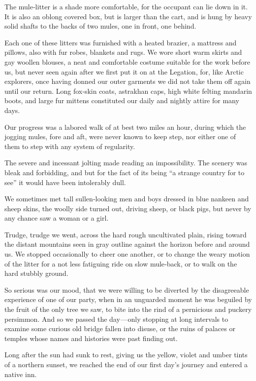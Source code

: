 \documentclass[12pt]{book}
\begin{document}
The mule‐litter is a shade more comfortable, for the occupant can lie down
in it. It is also an oblong covered box, but is larger than the cart, and is hung by
heavy solid shafts to the backs of two mules, one in front, one behind.

Each one of these litters was furnished with a heated brazier, a mattress and
pillows, also with fur robes, blankets and rugs. We wore short warm skirts and
gay woollen blouses, a neat and comfortable costume suitable for the work before
us, but never seen again after we first put it on at the Legation, for, like Arctic
explorers, once having donned our outer garments we did not take them off again
until our return. Long fox‐skin coats, astrakhan caps, high white felting mandarin
boots, and large fur mittens constituted our daily and nightly attire for many
days.

Our progress was a labored walk of at best two miles an hour, during which
the jogging mules, fore and aft, were never known to keep step, nor either one of
them to step with any system of regularity.

The severe and incessant jolting made reading an impossibility. The scenery
was bleak and forbidding, and but for the fact of its being “a strange country for
to see” it would have been intolerably dull.

We sometimes met tall sullen‐looking men and boys dressed in blue nankeen
and sheep skins, the woolly side turned out, driving sheep, or black pigs, but
never by any chance saw a woman or a girl.

Trudge, trudge we went, across the hard rough uncultivated plain, rising
toward the distant mountains seen in gray outline against the horizon before and
around us. We stopped occasionally to cheer one another, or to change the weary
motion of the litter for a not less fatiguing ride on slow mule‐back, or to walk on
the hard stubbly ground.

So serious was our mood, that we were willing to be diverted by the disagreeable experience of one of our party, when in an unguarded moment he was
beguiled by the fruit of the only tree we saw, to bite into the rind of a pernicious
and puckery persimmon. And so we passed the day — only stopping at long
intervals to examine some curious old bridge fallen into disuse, or the ruins of
palaces or temples whose names and histories were past finding out.

Long after the sun had sunk to rest, giving us the yellow, violet and umber
tints of a northern sunset, we reached the end of our first day’s journey and
entered a native inn.
\end{document}
